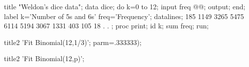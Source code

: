 \begin{listing}
title "Weldon's dice data";
data dice;
   do k=0 to 12;
      input freq @@;
      output;
      end;
   label k='Number of 5s and 6s'
      freq='Frequency';
   datalines;
185  1149  3265  5475  6114  5194  3067  1331  403  105  18  .  .
;
proc print;
   id k;
   sum freq;
run;   

title2 'Fit Binomial(12,1/3)';
   parm=.333333);

title2 'Fit Binomial(12,p)';
   
\end{listing}
